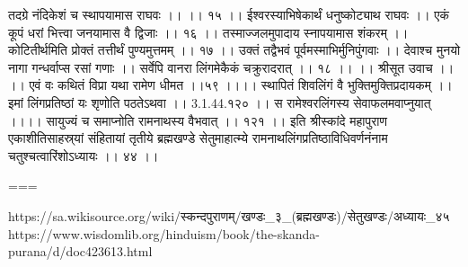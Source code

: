 तदग्रे नंदिकेशं च स्थापयामास राघवः ।। ।। १५ ।।
ईश्वरस्याभिषेकार्थं धनुष्कोट्याथ राघवः ।।
एकं कूपं धरां भित्त्वा जनयामास वै द्विजाः ।। १६ ।।
तस्माज्जलमुपादाय स्नापयामास शंकरम् ।।
कोटितीर्थमिति प्रोक्तं तत्तीर्थं पुण्यमुत्तमम् ।। १७ ।।
उक्तं तद्वैभवं पूर्वमस्माभिर्मुनिपुंगवाः ।।
देवाश्च मुनयो नागा गन्धर्वाप्स रसां गणाः ।।
सर्वेपि वानरा लिंगमेकैकं चक्रुरादरात् ।। १८ ।।
।। श्रीसूत उवाच ।। ।।
एवं वः कथितं विप्रा यथा रामेण धीमत ।।५९ ।।।।
स्थापितं शिवलिंगं वै भुक्तिमुक्तिप्रदायकम् ।।
इमां लिंगप्रतिष्ठां यः शृणोति पठतेऽथवा ।। 3.1.44.१२० ।।
स रामेश्वरलिंगस्य सेवाफलमवाप्नुयात् ।।।।
सायुज्यं च समाप्नोति रामनाथस्य वैभवात् ।। १२१ ।।
इति श्रीस्कांदे महापुराण एकाशीतिसाहस्र्यां संहितायां तृतीये ब्रह्मखण्डे सेतुमाहात्म्ये रामनाथलिंगप्रतिष्ठाविधिवर्णनंनाम चतुश्चत्वारिंशोऽध्यायः ।। ४४ ।।


===

https://sa.wikisource.org/wiki/स्कन्दपुराणम्/खण्डः_३_(ब्रह्मखण्डः)/सेतुखण्डः/अध्यायः_४५
https://www.wisdomlib.org/hinduism/book/the-skanda-purana/d/doc423613.html

